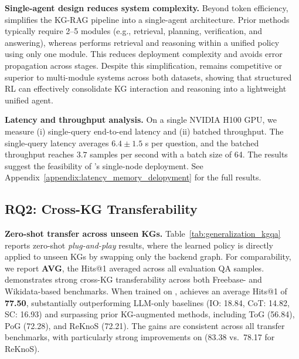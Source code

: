 \noindent \textbf{Single-agent design reduces system complexity.} Beyond token efficiency, \framework{} simplifies the KG-RAG pipeline into a single-agent architecture. Prior methods typically require 2--5 modules (e.g., retrieval, planning, verification, and answering), whereas \framework{} performs retrieval and reasoning within a unified policy using only one module. This reduces deployment complexity and avoids error propagation across stages. Despite this simplification, \framework{} remains competitive or superior to multi-module systems across both datasets, showing that structured RL can effectively consolidate KG interaction and reasoning into a lightweight unified agent.

\noindent \textbf{Latency and throughput analysis.} 
On a single NVIDIA H100 GPU, we measure (i) single-query end-to-end latency and (ii) batched throughput. The single-query latency averages \(6.4\pm1.5\) s per question, and the batched throughput reaches \(3.7\) samples per second with a batch size of 64. The results suggest the feasibility of \framework{}'s single-node deployment. See Appendix~\ref{appendix:latency_memory_delopyment} for the full results.









\subsection{RQ2: Cross-KG Transferability}
\label{sec:exp2}


\noindent\textbf{Zero-shot transfer across unseen KGs.}
Table~\ref{tab:generalization_kgqa} reports zero-shot \emph{plug-and-play} results, where the learned policy is directly applied to unseen KGs by swapping only the backend graph. For comparability, we report \textbf{AVG}, the Hits@1 averaged across all evaluation QA samples.
\framework{} demonstrates strong cross-KG transferability across both Freebase- and Wikidata-based benchmarks. When trained on , \framework{} achieves an average Hits@1 of \textbf{77.50}, substantially outperforming LLM-only baselines (IO: 18.84, CoT: 14.82, SC: 16.93) and surpassing prior KG-augmented methods, including ToG (56.84), PoG (72.28), and ReKnoS (72.21). The gains are consistent across all transfer benchmarks, with particularly strong improvements on  (83.38 vs.\ 78.17 for ReKnoS). 

